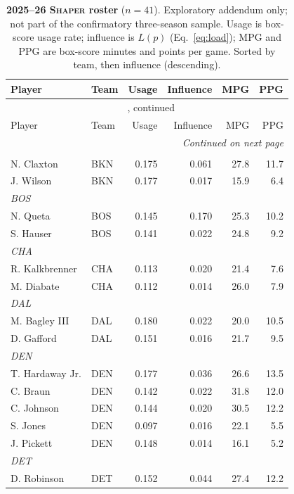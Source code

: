 \documentclass[11pt]{article}
\newcommand{\load}{\ensuremath{L}} %
\begin{document}
\begin{longtable}{llrrrr}
\caption{\textbf{2025--26 \textsc{Shaper} roster} ($n=41$). Exploratory addendum only; not
part of the confirmatory three-season sample. Usage is box-score usage rate; influence is
$\load(p)$ (Eq.~\ref{eq:load}); MPG and PPG are box-score minutes and points per game. Sorted
by team, then influence (descending).}
\label{tab:shaper-appendix}\\
\toprule
Player & Team & Usage & Influence & MPG & PPG \\
\midrule
\endfirsthead
\multicolumn{6}{c}{\tablename~\thetable{} ,  continued} \\
\toprule
Player & Team & Usage & Influence & MPG & PPG \\
\midrule
\endhead
\midrule
\multicolumn{6}{r}{\emph{Continued on next page}} \\
\endfoot
\bottomrule
\endlastfoot
\multicolumn{6}{l}{\textit{BKN}} \\
N. Claxton & BKN & 0.175 & 0.061 & 27.8 & 11.7 \\
J. Wilson & BKN & 0.177 & 0.017 & 15.9 & 6.4 \\
\multicolumn{6}{l}{\textit{BOS}} \\
N. Queta & BOS & 0.145 & 0.170 & 25.3 & 10.2 \\
S. Hauser & BOS & 0.141 & 0.022 & 24.8 & 9.2 \\
\multicolumn{6}{l}{\textit{CHA}} \\
R. Kalkbrenner & CHA & 0.113 & 0.020 & 21.4 & 7.6 \\
M. Diabate & CHA & 0.112 & 0.014 & 26.0 & 7.9 \\
\multicolumn{6}{l}{\textit{DAL}} \\
M. Bagley III & DAL & 0.180 & 0.022 & 20.0 & 10.5 \\
D. Gafford & DAL & 0.151 & 0.016 & 21.7 & 9.5 \\
\multicolumn{6}{l}{\textit{DEN}} \\
T. Hardaway Jr. & DEN & 0.177 & 0.036 & 26.6 & 13.5 \\
C. Braun & DEN & 0.142 & 0.022 & 31.8 & 12.0 \\
C. Johnson & DEN & 0.144 & 0.020 & 30.5 & 12.2 \\
S. Jones & DEN & 0.097 & 0.016 & 22.1 & 5.5 \\
J. Pickett & DEN & 0.148 & 0.014 & 16.1 & 5.2 \\
\multicolumn{6}{l}{\textit{DET}} \\
D. Robinson & DET & 0.152 & 0.044 & 27.4 & 12.2 \\

\end{longtable}
\end{document}
